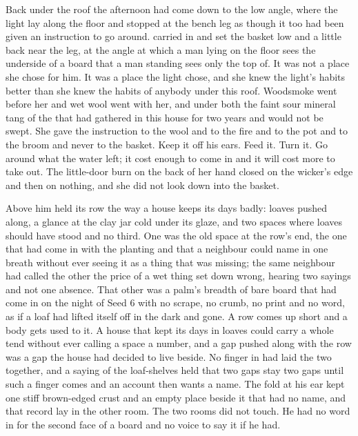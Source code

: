 Back under the roof the afternoon had come down to the low angle, where the light lay along the floor and stopped at the bench leg as though it too had been given an instruction to go around.  carried  in and set the basket low and a little back near the leg, at the angle at which a man lying on the floor sees the underside of a board that a man standing sees only the top of. It was not a place she chose for him. It was a place the light chose, and she knew the light's habits better than she knew the habits of anybody under this roof. Woodsmoke went before her and wet wool went with her, and under both the faint sour mineral tang of the  that had gathered in this house for two years and would not be swept. She gave the instruction to the wool and to the fire and to the pot and to the broom and never to the basket. Keep it off his ears. Feed it. Turn it. Go around what the water left; it cost enough to come in and it will cost more to take out. The little-door burn on the back of her hand closed on the wicker's edge and then on nothing, and she did not look down into the basket.

Above him  held its row the way a house keeps its days badly: loaves pushed along, a glance at the clay jar cold under its glaze, and two spaces where loaves should have stood and no third. One was the old space at the row's end, the one that had come in with the planting and that a neighbour could name in one breath without ever seeing it as a thing that was missing; the same neighbour had called the other the price of a wet thing set down wrong, hearing two sayings and not one absence. That other was a palm's breadth of bare board that had come in on the night of Seed 6 with no scrape, no crumb, no print and no word, as if a loaf had lifted itself off in the dark and gone. A row comes up short and a body gets used to it. A house that kept its days in loaves could carry a whole tend without ever calling a space a number, and a gap pushed along with the row was a gap the house had decided to live beside. No finger in  had laid the two together, and a saying of the loaf-shelves held that two gaps stay two gaps until such a finger comes and an account then wants a name. The fold at his ear kept one stiff brown-edged crust and an empty place beside it that had no name, and that record lay in the other room. The two rooms did not touch. He had no word in  for the second face of a board and no voice to say it if he had.

